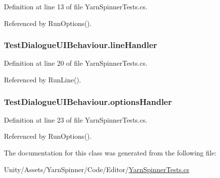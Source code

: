 Definition at line 13 of file Yarn\-Spinner\-Tests.\-cs.



Referenced by Run\-Options().

\hypertarget{a00171_af87332992e1420a8b2047822fab2b03c}{
\subsubsection[{line\-Handler}]{ Test\-Dialogue\-U\-I\-Behaviour.\-line\-Handler}}\label{a00171_af87332992e1420a8b2047822fab2b03c}


Definition at line 20 of file Yarn\-Spinner\-Tests.\-cs.



Referenced by Run\-Line().

\hypertarget{a00171_adcbea72eb6f5ab305b3757789919f961}{
\subsubsection[{options\-Handler}]{ Test\-Dialogue\-U\-I\-Behaviour.\-options\-Handler}}\label{a00171_adcbea72eb6f5ab305b3757789919f961}


Definition at line 23 of file Yarn\-Spinner\-Tests.\-cs.



Referenced by Run\-Options().



The documentation for this class was generated from the following file\-:\begin{DoxyCompactItemize}
\item 
Unity/\-Assets/\-Yarn\-Spinner/\-Code/\-Editor/\hyperlink{a00294}{Yarn\-Spinner\-Tests.\-cs}\end{DoxyCompactItemize}
